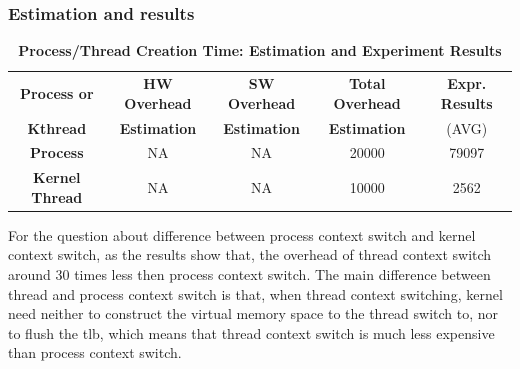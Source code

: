 \subsubsection{Estimation and results}
\begin{table}[ht]
    \centering
    \caption{\textbf{Process/Thread Creation Time: Estimation and Experiment Results}}
    \begin{threeparttable}
        \begin{tabular}{ccccc}
        \hline
        \textbf{Process or} & \textbf{HW Overhead} & \textbf{SW Overhead } & \textbf{Total Overhead} & \textbf{Expr.        Results} \\
        \textbf{Kthread} & \textbf{Estimation}       &  \textbf{Estimation}         & \textbf{Estimation}  & (AVG)   \\
        \hline
        \textbf{Process} & NA & NA & 20000 & 79097 \\
        \textbf{Kernel Thread} & NA & NA & 10000 & 2562\\
        \hline
        \end{tabular}
    \end{threeparttable}
    \label{context_switch_time}
\end{table}

For the question about difference between process context switch and kernel context switch, as the results show that, the overhead of thread context switch around 30 times less then process context switch. The main difference between thread and process context switch
is that, when thread context switching, kernel need neither to construct the virtual memory space to the thread switch to, nor to flush the tlb, which means that thread context switch is much less expensive than process context switch.
